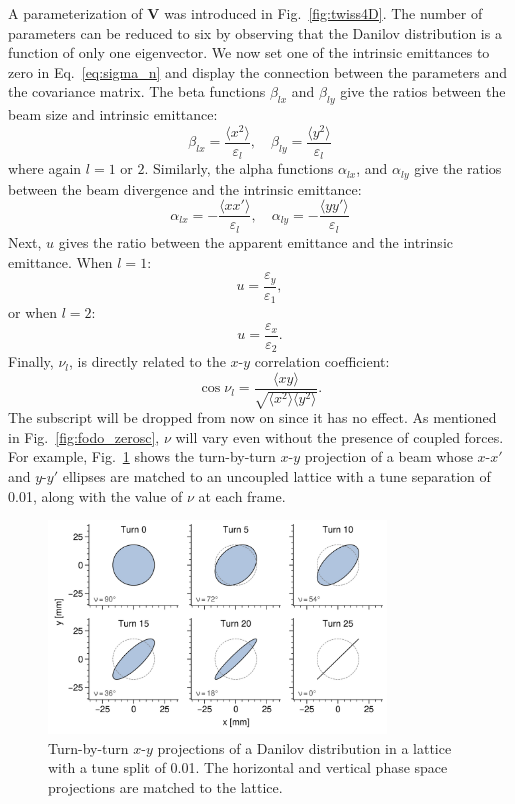 A parameterization of $\mathbf{V}$ was introduced in Fig.~\ref{fig:twiss4D}. The number of parameters can be reduced to six by observing that the Danilov distribution is a function of only one eigenvector. We now set one of the intrinsic emittances to zero in Eq.~\eqref{eq:sigma_n} and display the connection between the parameters and the covariance matrix. The beta functions $\beta_{lx}$ and $\beta_{ly}$ give the ratios between the beam size and intrinsic emittance:
%
\begin{equation}
    \beta_{lx} = \frac{\langle{x^2}\rangle}{\varepsilon_l}, \quad
    \beta_{ly} = \frac{\langle{y^2}\rangle}{\varepsilon_l}
\end{equation}
%
where again $l = 1$ or $2$. Similarly, the alpha functions $\alpha_{lx}$, and $\alpha_{ly}$ give the ratios between the beam divergence and the intrinsic emittance:
%
\begin{equation}
    \alpha_{lx} = -\frac{\langle{xx'}\rangle}{\varepsilon_l}, \quad
    \alpha_{ly} = -\frac{\langle{yy'}\rangle}{\varepsilon_l}
\end{equation}
%
Next, $u$ gives the ratio between the apparent emittance and the intrinsic emittance. When $l = 1$:
%
\begin{equation} \label{eq:u}
     u = \frac{\varepsilon_y}{\varepsilon_1},
\end{equation}
%
or when $l = 2$:
%
\begin{equation}
     u = \frac{\varepsilon_x}{\varepsilon_2}.
\end{equation}
%
Finally, $\nu_l$, is directly related to the $x$-$y$ correlation coefficient:
%
\begin{equation}
    \cos\nu_l = \frac{\langle{xy}\rangle}{\sqrt{\langle{x^2}\rangle\langle{y^2}\rangle}}.
\end{equation}
%
The subscript will be dropped from now on since it has no effect. As mentioned in Fig.~\ref{fig:fodo_zerosc}, $\nu$ will vary even without the presence of coupled forces. For example, Fig.~\ref{fig:splittunes_tbt} shows the turn-by-turn $x$-$y$ projection of a beam whose $x$-$x'$ and $y$-$y'$ ellipses are matched to an uncoupled lattice with a tune separation of 0.01, along with the value of $\nu$ at each frame. 
%
\begin{figure}[!p]
    \centering
    \includegraphics[width=0.8\textwidth]{Images/chapter2/splittunes_tbt.png}
    \caption{Turn-by-turn $x$-$y$ projections of a Danilov distribution in a lattice with a tune split of 0.01. The horizontal and vertical phase space projections are matched to the lattice.}
    \label{fig:splittunes_tbt}
\end{figure}
